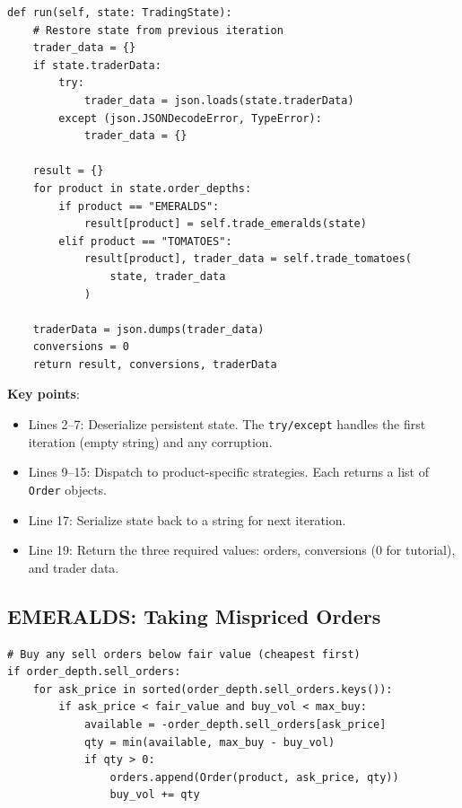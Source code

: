 \documentclass[11pt, letterpaper]{article}
\begin{document}
\begin{lstlisting}[caption={Main entry point called each iteration.}]
def run(self, state: TradingState):
    # Restore state from previous iteration
    trader_data = {}
    if state.traderData:
        try:
            trader_data = json.loads(state.traderData)
        except (json.JSONDecodeError, TypeError):
            trader_data = {}

    result = {}
    for product in state.order_depths:
        if product == "EMERALDS":
            result[product] = self.trade_emeralds(state)
        elif product == "TOMATOES":
            result[product], trader_data = self.trade_tomatoes(
                state, trader_data
            )

    traderData = json.dumps(trader_data)
    conversions = 0
    return result, conversions, traderData
\end{lstlisting}

\textbf{Key points}:
\begin{itemize}
    \item Lines 2--7: Deserialize persistent state. The \texttt{try/except} handles the first iteration (empty string) and any corruption.
    \item Lines 9--15: Dispatch to product-specific strategies. Each returns a list of \texttt{Order} objects.
    \item Line 17: Serialize state back to a string for next iteration.
    \item Line 19: Return the three required values: orders, conversions (0 for tutorial), and trader data.
\end{itemize}

\subsection{EMERALDS: Taking Mispriced Orders}

\begin{lstlisting}[caption={Phase 1: Buy cheap asks and sell to expensive bids.}]
# Buy any sell orders below fair value (cheapest first)
if order_depth.sell_orders:
    for ask_price in sorted(order_depth.sell_orders.keys()):
        if ask_price < fair_value and buy_vol < max_buy:
            available = -order_depth.sell_orders[ask_price]
            qty = min(available, max_buy - buy_vol)
            if qty > 0:
                orders.append(Order(product, ask_price, qty))
                buy_vol += qty
\end{lstlisting}
\end{document}
